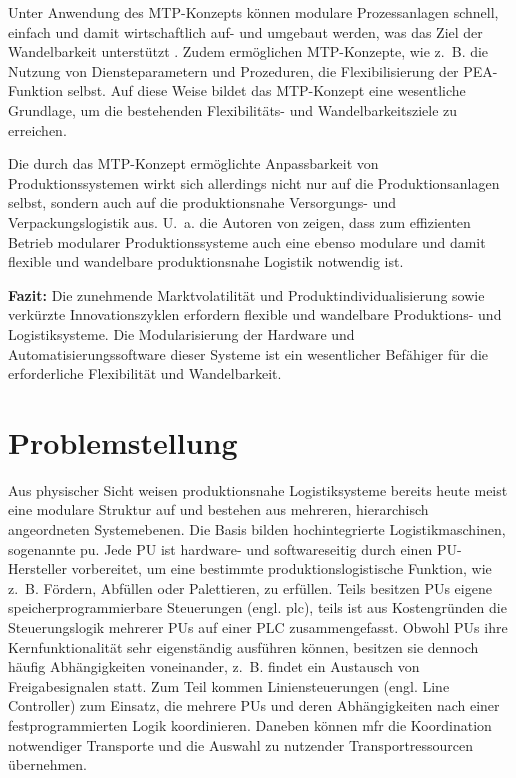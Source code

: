 Unter Anwendung des MTP-Konzepts können modulare Prozessanlagen schnell, einfach und damit wirtschaftlich auf- und umgebaut werden, was das Ziel der Wandelbarkeit unterstützt \cite{Holm.2016,NAMURProcessNetVDMAundZVEI.2021.DE}. Zudem ermöglichen MTP-Konzepte, wie z.~B. die Nutzung von Diensteparametern und Prozeduren, die Flexibilisierung der PEA-Funktion selbst. Auf diese Weise bildet das MTP-Konzept eine wesentliche Grundlage, um die bestehenden Flexibilitäts- und Wandelbarkeitsziele zu erreichen. 

Die durch das MTP-Konzept ermöglichte Anpassbarkeit von Produktionssystemen wirkt sich allerdings nicht nur auf die Produktionsanlagen selbst, sondern auch auf die produktionsnahe Versorgungs- und Verpackungslogistik aus. U.~a. die Autoren von \cite{Kessler.2015,Lier.2015.DE} zeigen, dass zum effizienten Betrieb modularer Produktionssysteme auch eine ebenso modulare und damit flexible und wandelbare produktionsnahe Logistik notwendig ist.

\begin{graybox}
	\textbf{Fazit:}	Die zunehmende Marktvolatilität und Produktindividualisierung sowie verkürzte Innovationszyklen erfordern flexible und wandelbare Produktions- und Logistiksysteme. Die Modularisierung der Hardware und Automatisierungssoftware dieser Systeme ist ein wesentlicher Befähiger für die erforderliche Flexibilität und Wandelbarkeit.
\end{graybox}

\section{Problemstellung}
\label{sec:problem}

Aus physischer Sicht weisen produktionsnahe Logistiksysteme bereits heute meist eine modulare Struktur auf und bestehen aus mehreren, hierarchisch angeordneten System\-ebenen. Die Basis bilden hochintegrierte Logistikmaschinen, sogenannte \gls{pu}. Jede PU ist hardware- und softwareseitig durch einen PU-Hersteller vorbereitet, um eine bestimmte produktionslogistische Funktion, wie z.~B. Fördern, Abfüllen oder Palettieren, zu erfüllen. Teils besitzen PUs eigene speicherprogrammierbare Steuerungen (engl. \gls{plc}), teils ist aus Kostengründen die Steuerungslogik mehrerer PUs auf einer PLC zusammengefasst. Obwohl PUs ihre Kernfunktionalität sehr eigenständig ausführen können, besitzen sie dennoch häufig Abhängigkeiten voneinander, z.~B. findet ein Austausch von Freigabesignalen statt. Zum Teil kommen Liniensteuerungen (engl. Line Controller) zum Einsatz, die mehrere PUs und deren Abhängigkeiten nach einer festprogrammierten Logik koordinieren. Daneben können \gls{mfr} die Koordination notwendiger Transporte und die Auswahl zu nutzender Transportressourcen übernehmen. \cite{NAMURAK4.19.2023,Lenz.2017}

